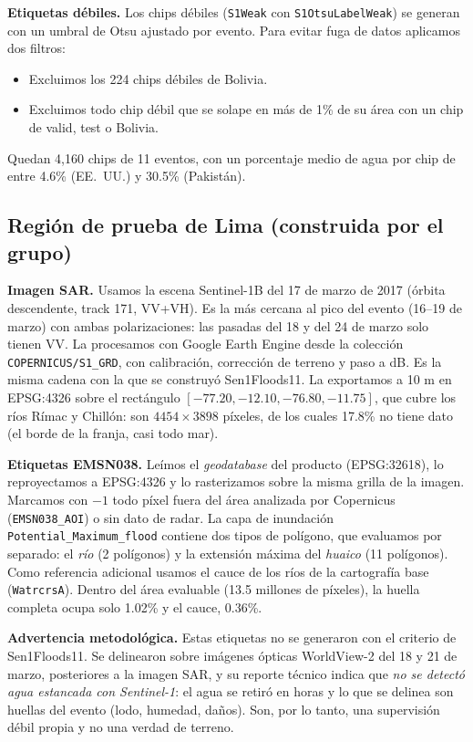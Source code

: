 \documentclass{article}
\begin{document}
\textbf{Etiquetas débiles.} Los chips débiles (\texttt{S1Weak} con \texttt{S1OtsuLabelWeak}) se generan con un umbral de Otsu ajustado por evento. Para evitar fuga de datos aplicamos dos filtros:
\begin{itemize}
  \item Excluimos los 224 chips débiles de Bolivia.
  \item Excluimos todo chip débil que se solape en más de 1\% de su área con un chip de valid, test o Bolivia.
\end{itemize}
Quedan 4,160 chips de 11 eventos, con un porcentaje medio de agua por chip de entre 4.6\% (EE.~UU.) y 30.5\% (Pakistán).

\subsection{Región de prueba de Lima (construida por el grupo)}

\textbf{Imagen SAR.} Usamos la escena Sentinel-1B del 17 de marzo de 2017 (órbita descendente, track 171, VV+VH). Es la más cercana al pico del evento (16--19 de marzo) con ambas polarizaciones: las pasadas del 18 y del 24 de marzo solo tienen VV. La procesamos con Google Earth Engine \citep{gorelick2017} desde la colección \texttt{COPERNICUS/S1\_GRD}, con calibración, corrección de terreno y paso a dB. Es la misma cadena con la que se construyó Sen1Floods11. La exportamos a 10 m en EPSG:4326 sobre el rectángulo $[-77.20, -12.10, -76.80, -11.75]$, que cubre los ríos Rímac y Chillón: son $4454 \times 3898$ píxeles, de los cuales 17.8\% no tiene dato (el borde de la franja, casi todo mar).

\textbf{Etiquetas EMSN038.} Leímos el \emph{geodatabase} del producto (EPSG:32618), lo reproyectamos a EPSG:4326 y lo rasterizamos sobre la misma grilla de la imagen. Marcamos con $-1$ todo píxel fuera del área analizada por Copernicus (\texttt{EMSN038\_AOI}) o sin dato de radar. La capa de inundación \texttt{Potential\_Maximum\_flood} contiene dos tipos de polígono, que evaluamos por separado: el \emph{río} (2 polígonos) y la extensión máxima del \emph{huaico} (11 polígonos). Como referencia adicional usamos el cauce de los ríos de la cartografía base (\texttt{WatrcrsA}). Dentro del área evaluable (13.5 millones de píxeles), la huella completa ocupa solo 1.02\% y el cauce, 0.36\%.

\textbf{Advertencia metodológica.} Estas etiquetas no se generaron con el criterio de Sen1Floods11. Se delinearon sobre imágenes ópticas WorldView-2 del 18 y 21 de marzo, posteriores a la imagen SAR, y su reporte técnico indica que \emph{no se detectó agua estancada con Sentinel-1}: el agua se retiró en horas y lo que se delinea son huellas del evento (lodo, humedad, daños). Son, por lo tanto, una supervisión débil propia y no una verdad de terreno.
\end{document}
